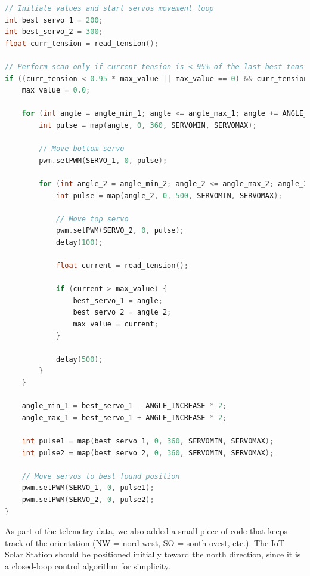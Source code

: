 \begin{lstlisting}[style=mystyle,language=C,caption={The \texttt{get\_direction} function keeps track of the 2 rotation axis and computes the direction.}]
// Initiate values and start servos movement loop
int best_servo_1 = 200;
int best_servo_2 = 300;
float curr_tension = read_tension();

// Perform scan only if current tension is < 95% of the last best tension, and it is daytime (tension > 0.15)
if ((curr_tension < 0.95 * max_value || max_value == 0) && curr_tension > 0.15) {
    max_value = 0.0;

    for (int angle = angle_min_1; angle <= angle_max_1; angle += ANGLE_INCREASE) {
        int pulse = map(angle, 0, 360, SERVOMIN, SERVOMAX);

        // Move bottom servo
        pwm.setPWM(SERVO_1, 0, pulse);

        for (int angle_2 = angle_min_2; angle_2 <= angle_max_2; angle_2 += ANGLE_INCREASE) {
            int pulse = map(angle_2, 0, 500, SERVOMIN, SERVOMAX);

            // Move top servo
            pwm.setPWM(SERVO_2, 0, pulse);
            delay(100);

            float current = read_tension();

            if (current > max_value) {
                best_servo_1 = angle;
                best_servo_2 = angle_2;
                max_value = current;
            }

            delay(500);
        }
    }

    angle_min_1 = best_servo_1 - ANGLE_INCREASE * 2;
    angle_max_1 = best_servo_1 + ANGLE_INCREASE * 2;

    int pulse1 = map(best_servo_1, 0, 360, SERVOMIN, SERVOMAX);
    int pulse2 = map(best_servo_2, 0, 360, SERVOMIN, SERVOMAX);

    // Move servos to best found position
    pwm.setPWM(SERVO_1, 0, pulse1);
    pwm.setPWM(SERVO_2, 0, pulse2);
}
\end{lstlisting}

As part of the telemetry data, we also added a small piece of code that keeps
track of the orientation (NW = nord west, SO = south ovest, etc.). The IoT Solar
Station should be positioned initially toward the north direction, since it is a
closed-loop control algorithm for simplicity.

